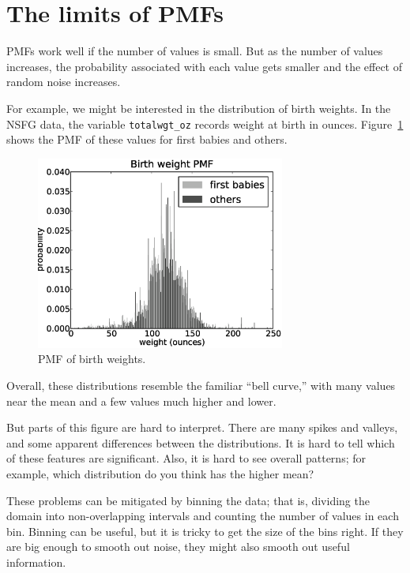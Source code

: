 \documentclass[12pt]{book}
\begin{document}
\section{The limits of PMFs}

PMFs work well if the number of values is small.  But as the
number of values increases, the probability associated with each value
gets smaller and the effect of random noise increases.

For example, we might be interested in the distribution of birth
weights.  In the NSFG data, the variable \verb"totalwgt_oz" records
weight at birth in ounces.  Figure~\ref{nsfg_birthwgt_pmf} shows the
PMF of these values for first babies and others.


\begin{figure}
\centerline{\includegraphics[height=2.5in]{figs/nsfg_birthwgt_pmf.eps}}
\caption{PMF of birth weights.}
\label{nsfg_birthwgt_pmf}
\end{figure}

Overall, these distributions resemble the familiar ``bell curve,'' with
many values near the mean and a few values much higher and lower.

But parts of this figure are hard to interpret.  There are many spikes
and valleys, and some apparent differences between the distributions.
It is hard to tell which of these features are significant.  Also, it
is hard to see overall patterns; for example, which distribution do
you think has the higher mean?


These problems can be mitigated by binning the data;
that is, dividing the domain into non-overlapping intervals and counting
the number of values in each bin.  Binning can be useful, but it is
tricky to get the size of the bins right.  If they are big enough to
smooth out noise, they might also smooth out useful information.
\end{document}
